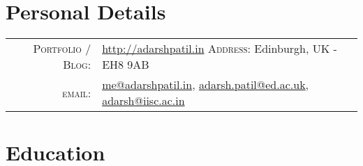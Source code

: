 \documentclass[a4paper,10pt]{article} %
\begin{document}
\pagestyle{empty} %



\par{\bigskip\par} %

\section{Personal Details}

\begin{tabular}{rl}
\textsc{Portfolio / Blog:} & \href{http://adarshpatil.in/timewarp}{http://adarshpatil.in} \hspace{2cm} \textsc{Address:} Edinburgh, UK - EH8 9AB\\
\textsc{email:} & \href{mailto:me@adarshpatil.in}{me@adarshpatil.in}, \href{mailto:adarsh.patil@ed.ac.uk}{adarsh.patil@ed.ac.uk}, \href{mailto:adarsh@iisc.ac.in}{adarsh@iisc.ac.in}\\
\end{tabular}


\section{Education}
\end{document}
